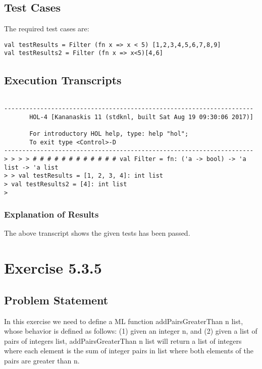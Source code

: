 \documentclass{report}
\begin{document}
\section{Test Cases}
\label{sec:test-cases-3}

The required test cases are:
\begin{lstlisting}[frame = tRBL ]
val testResults = Filter (fn x => x < 5) [1,2,3,4,5,6,7,8,9]
val testResults2 = Filter (fn x => x<5)[4,6]
\end{lstlisting}


\section{Execution Transcripts}
\label{sec:exec-transcr-3}

\setcounter{sessioncount}{0}
\begin{session}
  \begin{scriptsize}
\begin{verbatim}

---------------------------------------------------------------------
       HOL-4 [Kananaskis 11 (stdknl, built Sat Aug 19 09:30:06 2017)]

       For introductory HOL help, type: help "hol";
       To exit type <Control>-D
---------------------------------------------------------------------
> > > > # # # # # # # # # # # # val Filter = fn: ('a -> bool) -> 'a list -> 'a list
> > val testResults = [1, 2, 3, 4]: int list
> val testResults2 = [4]: int list
> 
\end{verbatim}
  \end{scriptsize}
\end{session}

\subsection{Explanation of Results}
\label{sec:explanation-results-3}

The above transcript shows the given tests has been passed.


\chapter{Exercise 5.3.5}
\label{cha:exercise-5.3.5}

\section{Problem Statement}
\label{sec:problem-statement-4}
In this exercise we need to define a ML function addPairsGreaterThan n list, whose behavior is defined
as follows: (1) given an integer n, and (2) given a list of pairs of integers list, addPairsGreaterThan
n list will return a list of integers where each element is the sum of integer pairs in list where both
elements of the pairs are greater than n.
\end{document}
